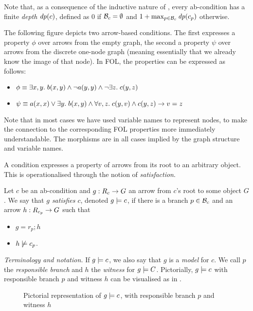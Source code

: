 Note that, as a consequence of the inductive nature of , every ab-condition has a finite \emph{depth} $\mathit{dp}(c)$, defined as $0$ if $\mathcal{B}_c=\emptyset$ and $1+\max_{p\in \mathcal{B}_c} \mathit{dp}(c_p)$ otherwise.

\begin{example}
The following figure depicts two arrow-based conditions. The first expresses a property $\phi$ over arrows from the empty graph, the second a property $\psi$ over arrows from the discrete one-node graph (meaning essentially that we already know the image of that node). In FOL, the properties can be expressed as follows:
\begin{itemize}
\item $\phi\equiv \exists x,y.\; b(x,y) \wedge \neg a(y,y)\wedge \neg \exists z.\; c(y,z)$
\item $\psi\equiv a(x,x)\vee \exists y.\; b(x,y) \wedge \forall v,z.\; c(y,v)\wedge c(y,z) \rightarrow v=z$
\end{itemize}
Note that in most cases we have used variable names to represent nodes, to make the connection to the corresponding FOL properties more immediately understandable. The morphisms are in all cases implied by the graph structure and variable names.
\begin{center}

\end{center}
\end{example}
%
A condition expresses a property of arrows from its root to an arbitrary object. This is operationalised through the notion of \emph{satisfaction}.

\begin{definition}
  Let $c$ be an ab-condition and $g:R_c\rightarrow G$ an arrow from $c$'s root to some object $G$. We say that \emph{$g$ satisfies $c$}, denoted $g\models c$, if there is a branch $p\in \mathcal{B}_c$ and an arrow $h:R_{c_p}\rightarrow G$ such that
  \begin{itemize}
  \item $g=r_p;h$
  \item $h\not\models c_p$.
  \end{itemize}
\end{definition}
%
\emph{Terminology and notation.} If $g\models c$, we also say that $g$ is a \emph{model} for $c$. We call $p$ the \emph{responsible branch} and $h$ the \emph{witness} for $g\models C$. Pictorially, $g\models c$ with responsible branch $p$ and witness $h$ can be visualised as in .
%
\begin{figure}
  \centering
  
  \caption{Pictorial representation of $g\models c$, with responsible branch $p$ and witness $h$}
\end{figure}

